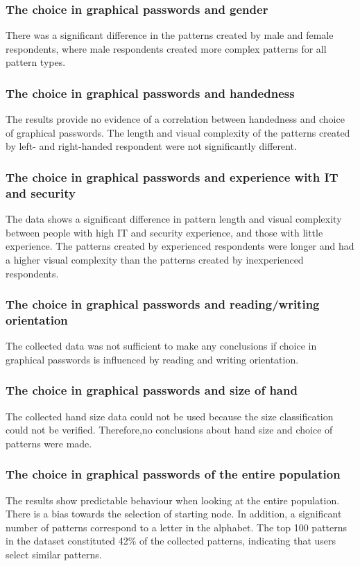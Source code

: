 \subsubsection*{The choice in graphical passwords and gender}
There was a significant difference in the patterns created by male and female respondents, where male respondents created more complex patterns for all pattern types. 

\subsubsection*{The choice in graphical passwords and handedness}
The results provide no evidence of a correlation between handedness and choice of graphical passwords. The length and visual complexity of the patterns created by left- and right-handed respondent were not significantly different. 

\subsubsection*{The choice in graphical passwords and experience with IT and security}
The data shows a significant difference in pattern length and visual complexity between people with high IT and security experience, and those with little experience. The patterns created by experienced respondents were longer and had a higher visual complexity than the patterns created by inexperienced respondents.

\subsubsection*{The choice in graphical passwords and reading/writing orientation}
The collected data was not sufficient to make any conclusions if choice in graphical passwords is influenced by reading and writing orientation.

\subsubsection*{The choice in graphical passwords and size of hand}
The collected hand size data could not be used because the size classification could not be verified. Therefore,no conclusions about hand size and choice of patterns were made.

\subsubsection*{The choice in graphical passwords of the entire population}
The results show predictable behaviour when looking at the entire population. There is a bias towards the selection of starting node. In addition, a significant number of patterns correspond to a letter in the alphabet. The top 100 patterns in the dataset constituted 42\% of the collected patterns, indicating that users select similar patterns. 


